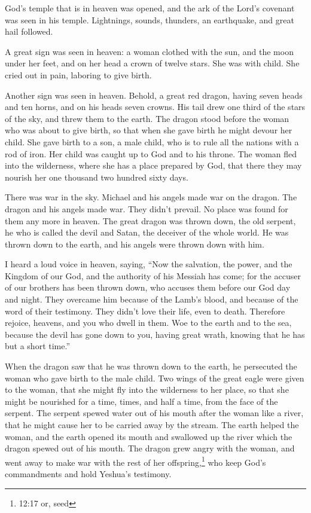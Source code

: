 \myverse{}God’s temple that is in heaven was opened, and the ark of the
Lord’s covenant was seen in his temple. Lightnings, sounds, thunders, an earthquake, and great hail followed.



\mychapter{} \myverse*{}A great sign was seen in heaven: a woman clothed with the sun,
and the moon under her feet, and on her head a crown of twelve stars.
\myverse{}She was with child. She cried out in pain, laboring to give birth.

\myverse{}Another sign was seen in heaven. Behold, a great red dragon, having
seven heads and ten horns, and on his heads seven crowns.
\myverse{}His tail drew one third of the stars of the sky, and threw them to the earth.
The dragon stood before the woman who was about to give birth, so that when she gave birth he might devour
her child.
\myverse{}She gave birth to a son, a male child, who is to rule all the nations with
a rod of iron. Her child was caught up to God and to his throne.
\myverse{}The woman fled into the wilderness, where she has a place prepared by God,
that there they may nourish her one thousand two hundred sixty days.

\myverse{}There was war in the sky. Michael and his angels made war on the
dragon. The dragon and his angels made war.
\myverse{}They didn’t prevail. No place was found for them any more in heaven.
\myverse{}The great dragon was thrown down, the old serpent, he who is called the devil
and Satan, the deceiver of the whole world. He was thrown down to the earth, and his angels were thrown
down with him.

\myverse{}I heard a loud voice in heaven, saying, “Now the salvation,
the power, and the Kingdom of our God, and the authority of his Messiah has come; for the accuser of our
brothers has been thrown down, who accuses them before our God day and night.
\myverse{}They overcame him because of the Lamb’s blood, and because of the word of
their testimony. They didn’t love their life, even to death.
\myverse{}Therefore rejoice, heavens, and you who dwell in them. Woe to the earth and
to the sea, because the devil has gone down to you, having great wrath, knowing that he has but a short
time.”

\myverse{}When the dragon saw that he was thrown down to the earth, he
persecuted the woman who gave birth to the male child.
\myverse{}Two wings of the great eagle were given to the woman, that she might fly
into the wilderness to her place, so that she might be nourished for a time, times, and half a time, from
the face of the serpent.
\myverse{}The serpent spewed water out of his mouth after the woman like a river, that
he might cause her to be carried away by the stream.
\myverse{}The earth helped the woman, and the earth opened its mouth and swallowed
up the river which the dragon spewed out of his mouth.
\myverse{}The dragon grew angry with the woman, and went away to make war with the
rest of her offspring,\footnote{12:17 or, seed} who keep God’s commandments and hold Yeshua’s testimony.


